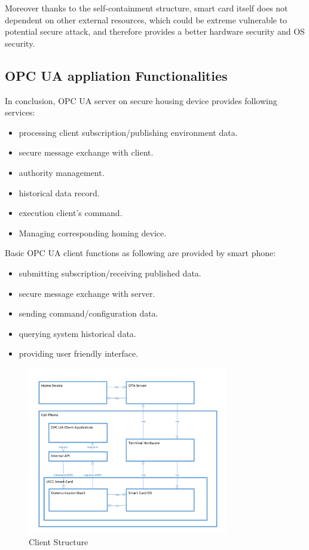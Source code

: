 Moreover thanks to the self-containment structure, smart card itself does not dependent on other external resources, which could be extreme vulnerable to potential secure attack, and therefore provides a better hardware security and OS security. 

\subsection{OPC UA appliation Functionalities}\label{secFunction}
In conclusion, OPC UA server on secure housing device provides following services:
 \begin{itemize}
  \item processing client subscription/publishing environment data.
  \item secure message exchange with client.
  \item authority management.
  \item historical data record.
  \item execution client's command.
  \item Managing corresponding homing device.
\end{itemize}
Basic OPC UA client functions as following are provided by smart phone:
 \begin{itemize}
  \item submitting subscription/receiving published data.
  \item secure message exchange with server.
  \item sending command/configuration data.
  \item querying system historical data.
  \item providing user friendly interface.
\end{itemize}


 \begin{figure}[!htb]
	\centering
	\includegraphics[width=0.78\textwidth]{clientStructure}
		\caption{Client Structure}
	\label{fig:clientStructure}
\end{figure}

